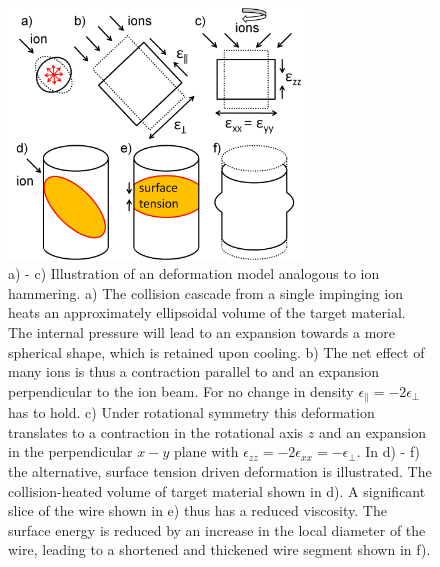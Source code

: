 \documentclass[12pt,
paper=a4,				
DIV=calc,		  %
BCOR=16mm,	  %
headinclude,
openany
]{scrbook}
\begin{document}
\begin{figure}[htbp]
	\centering
		\includegraphics[width=8cm]{images/deformationmodel.jpg}
	\caption{a) - c) Illustration of an deformation model analogous to ion hammering. a) The collision cascade from a single impinging ion heats an approximately ellipsoidal volume of the target material. The internal pressure will lead to an expansion towards a more spherical shape, which is retained upon cooling. b) The net effect of many ions is thus a contraction parallel to and an expansion perpendicular to the ion beam. For no change in density $\epsilon_\parallel = -2\epsilon_\perp$ has to hold. c) Under rotational symmetry this deformation translates to a contraction in the rotational axis $z$ and an expansion in the perpendicular $x-y$ plane with $\epsilon_{zz} = -2\epsilon_{xx} = -\epsilon_\perp$. In d) - f) the alternative, surface tension driven deformation is illustrated. The collision-heated volume of target material shown in d). A significant slice of the wire shown in e) thus has a reduced viscosity. The surface energy is reduced by an increase in the local diameter of the wire, leading to a shortened and thickened wire segment shown in f).} 
	\label{deformationmodel}
\end{figure}
\end{document}
